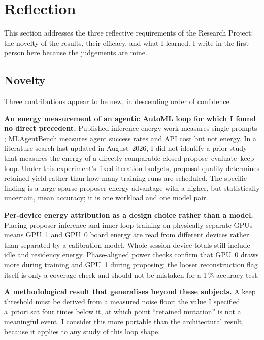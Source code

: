 \section{Reflection}\label{sec:reflection}

This section addresses the three reflective requirements of the Research Project:
the novelty of the results, their efficacy, and what I learned. I write in the
first person here because the judgements are mine.

\subsection{Novelty}

Three contributions appear to be new, in descending order of confidence.

\textbf{An energy measurement of an agentic AutoML loop for which I found no
direct precedent.} Published
inference-energy work measures single prompts \cite{luccioni2024power};
MLAgentBench \cite{huang2024mlagentbench} measures agent success rates and API
cost but not energy. In a literature search last updated in August~2026, I did
not identify a prior study that measures the energy of a directly comparable
closed propose--evaluate--keep loop. Under this experiment's fixed iteration
budgets, proposal quality determines retained yield rather than how many training
runs are scheduled. The specific finding is a large sparse-proposer energy
advantage with a higher, but statistically uncertain, mean accuracy; it is one
workload and one model pair.

\textbf{Per-device energy attribution as a design choice rather than a model.}
Placing proposer inference and inner-loop training on physically separate GPUs
means GPU~1 and GPU~0 board energy are read from different devices rather than
separated by a calibration model. Whole-session device totals still include idle
and residency energy. Phase-aligned power checks confirm that GPU~0 draws more
during training and GPU~1 during proposing; the looser reconstruction flag itself
is only a coverage check and should not be mistaken for a 1\,\% accuracy test.

\textbf{A methodological result that generalises beyond these subjects.} A keep
threshold must be derived from a measured noise floor; the value I specified
a~priori sat four times below it, at which point ``retained mutation'' is not a
meaningful event. I consider this more portable than the architectural result,
because it applies to any study of this loop shape.


